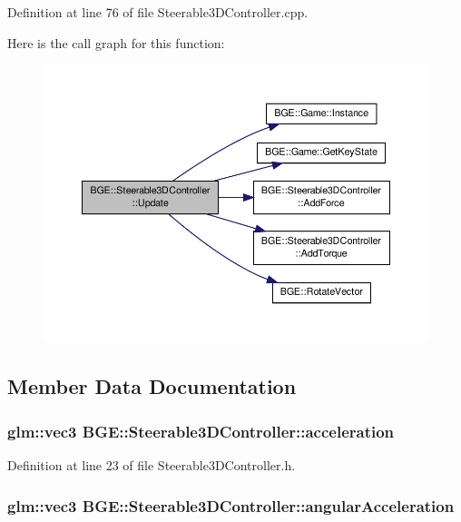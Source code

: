 Definition at line 76 of file Steerable3\-D\-Controller.\-cpp.



Here is the call graph for this function\-:
\nopagebreak
\begin{figure}[H]
\begin{center}
\leavevmode
\includegraphics[width=350pt]{class_b_g_e_1_1_steerable3_d_controller_a2bb51b669aa98dbed7a5afcc49ed33aa_cgraph}
\end{center}
\end{figure}




\subsection{Member Data Documentation}
\hypertarget{class_b_g_e_1_1_steerable3_d_controller_ad6991bb22a60e26e3fe695d414746a58}{
\subsubsection[{acceleration}]{\setlength{\rightskip}{0pt plus 5cm}glm\-::vec3 B\-G\-E\-::\-Steerable3\-D\-Controller\-::acceleration}}\label{class_b_g_e_1_1_steerable3_d_controller_ad6991bb22a60e26e3fe695d414746a58}


Definition at line 23 of file Steerable3\-D\-Controller.\-h.

\hypertarget{class_b_g_e_1_1_steerable3_d_controller_a213dbccf587d0e6539160c7f5f31bf61}{
\subsubsection[{angular\-Acceleration}]{\setlength{\rightskip}{0pt plus 5cm}glm\-::vec3 B\-G\-E\-::\-Steerable3\-D\-Controller\-::angular\-Acceleration}}\label{class_b_g_e_1_1_steerable3_d_controller_a213dbccf587d0e6539160c7f5f31bf61}


